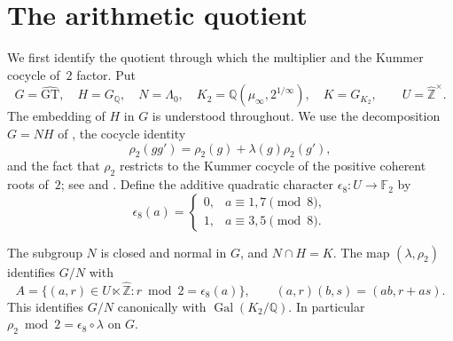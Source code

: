 \section{The arithmetic quotient}
\label{sec:arithmetic-quotient}

We first identify the quotient through which the multiplier and the Kummer
cocycle of~$2$ factor. Put
\[
 G=\widehat{\mathrm{GT}},\quad H=G_{\mathbb Q},\quad
 N=\Lambda _0,\quad
 K_2=\mathbb Q(\mu _\infty,2^{1/\infty}),\quad K=G_{K_2},
 \qquad U=\widehat{\mathbb Z}^{\times}.
\]
The embedding of $H$ in $G$ is understood throughout. We use the decomposition
$G=NH$ of \cite[Theorem~2]{H17}, the cocycle identity
\[
 \rho _2(gg')=\rho _2(g)+\lambda(g)\rho _2(g'),
\]
and the fact that $\rho _2$ restricts to the Kummer cocycle of the positive
coherent roots of~$2$; see \cite[Definition~5.1]{NS2000} and
\cite[Lemma~7]{H17}. Define the additive quadratic character
$\epsilon _8:U\to\mathbb F _2$ by
\[
 \epsilon _8(a)=
 \begin{cases}
 0,&a\equiv 1,7\pmod 8,\\
 1,&a\equiv 3,5\pmod 8.
 \end{cases}
\]

\begin{proposition}\label{prop:arithmetic-affine}
The subgroup $N$ is closed and normal in $G$, and $N\cap H=K$.
The map $(\lambda,\rho _2)$ identifies $G/N$ with
\[
 A=\{(a,r)\in U\ltimes\widehat{\mathbb Z}:
                 r\bmod 2=\epsilon _8(a)\},
 \qquad
 (a,r)(b,s)=(ab,r+as).
\]
This identifies $G/N$ canonically with $\operatorname{Gal}(K_2/\mathbb Q)$.
In particular $\rho _2\bmod 2=\epsilon _8\circ\lambda$ on $G$.
\end{proposition}

